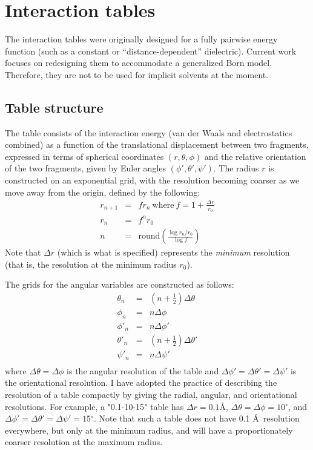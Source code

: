 \documentclass{article}      %
\begin{document}
\section{Interaction tables}

The interaction tables were originally designed for a fully pairwise energy function (such as a constant or ``distance-dependent'' dielectric).  Current work focuses on redesigning them to accommodate a generalized Born model.  Therefore, they are not to be used for implicit solvents at the moment.
\subsection{Table structure}
The table consists of the interaction energy (van der Waals and electrostatics combined) as a function of the translational displacement between two fragments, expressed in terms of spherical coordinates $(r, \theta, \phi)$ and the relative orientation of the two fragments, given by Euler angles $(\phi', \theta', \psi')$.  The radius $r$ is constructed on an exponential grid, with the resolution becoming coarser as we move away from the origin,  defined by the following:
\begin{eqnarray}
r_{n+1} &=& f r_n\ \textrm{where}\ f=1+\frac{\Delta r}{r_0} \\
r_n &=& f^n r_0 \nonumber\\
n &=& \textrm{round}\left(\frac{\log r_n/r_0}{\log f}\right) \nonumber
\end{eqnarray}
Note that $\Delta r$ (which is what is specified) represents the \emph{minimum} resolution (that is, the resolution at the minimum radius $r_0$).  

The grids for the angular variables  are constructed as follows:
\begin{eqnarray}
\theta_n&=& \left(n+\frac{1}{2}\right) \Delta \theta \\
\phi_n &=& n \Delta \phi \\
\phi'_n &=& n \Delta \phi' \\
\theta'_n &=& (n+\frac{1}{2}) \Delta \theta' \\
\psi'_n &=& n \Delta \psi' \\
\end{eqnarray}
where $\Delta \theta = \Delta \phi$ is the angular resolution of the table and $\Delta \phi' = \Delta \theta' = \Delta \psi'$ is the orientational resolution.  I have adopted the practice of describing the resolution of a table compactly by giving the radial, angular, and orientational resolutions.  For example, a "0.1-10-15" table has $\Delta r = 0.1 \textrm{\AA}$, $\Delta \theta = \Delta \phi = 10{}^\circ$, and $\Delta \phi' = \Delta \theta' = \Delta \psi' = 15{}^\circ$.  Note that such a table does not have 0.1 \AA\ resolution everywhere, but only at the minimum radius, and will have a proportionately coarser resolution at the maximum radius.  
\end{document}
